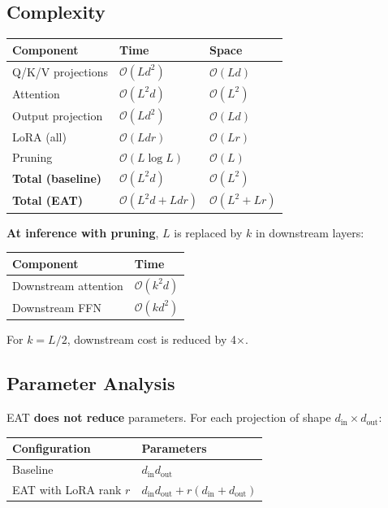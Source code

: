 \subsection{Complexity}

\begin{table}[H]
\centering
\small
\begin{tabular}{lll}
\toprule
\textbf{Component} & \textbf{Time} & \textbf{Space} \\
\midrule
Q/K/V projections & $\mathcal{O}(L d^2)$ & $\mathcal{O}(L d)$ \\
Attention & $\mathcal{O}(L^2 d)$ & $\mathcal{O}(L^2)$ \\
Output projection & $\mathcal{O}(L d^2)$ & $\mathcal{O}(L d)$ \\
LoRA (all) & $\mathcal{O}(L d r)$ & $\mathcal{O}(L r)$ \\
Pruning & $\mathcal{O}(L \log L)$ & $\mathcal{O}(L)$ \\
\textbf{Total (baseline)} & $\mathcal{O}(L^2 d)$ & $\mathcal{O}(L^2)$ \\
\textbf{Total (EAT)} & $\mathcal{O}(L^2 d + L d r)$ & $\mathcal{O}(L^2 + L r)$ \\
\bottomrule
\end{tabular}
\end{table}

\textbf{At inference with pruning}, $L$ is replaced by $k$ in downstream layers:

\begin{table}[H]
\centering
\small
\begin{tabular}{ll}
\toprule
\textbf{Component} & \textbf{Time} \\
\midrule
Downstream attention & $\mathcal{O}(k^2 d)$ \\
Downstream FFN & $\mathcal{O}(k d^2)$ \\
\bottomrule
\end{tabular}
\end{table}

For $k = L / 2$, downstream cost is reduced by 4$\times$.

\subsection{Parameter Analysis}

EAT \textbf{does not reduce} parameters. For each projection of shape 
$d_\text{in} \times d_\text{out}$:

\begin{table}[H]
\centering
\small
\begin{tabular}{ll}
\toprule
\textbf{Configuration} & \textbf{Parameters} \\
\midrule
Baseline & $d_\text{in} d_\text{out}$ \\
EAT with LoRA rank $r$ & $d_\text{in} d_\text{out} + r(d_\text{in} + d_\text{out})$ \\
\bottomrule
\end{tabular}
\end{table}


